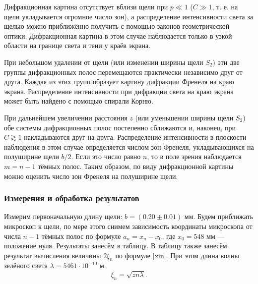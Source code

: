 \documentclass[a4paper, 12pt]{article}%
\begin{document}
	Дифракционная картина отсутствует вблизи щели при $ p \ll 1 $ ($ C \gg 1 $, т. е. на щели укладывается огромное число зон), а распределение интенсивности света за щелью можно приближённо получить с помощью законов геометрической оптики. Дифракционная картина в этом случае наблюдается только в узкой области на границе света и тени у краёв экрана.
	
	При небольшом удалении от щели (или изменении ширины щели $ S_2 $) эти две группы дифракционных полос перемещаются практически независимо друг от друга. Каждая из этих групп образует картину дифракции Френеля на краю экрана. Распределение интенсивности при дифракции света на краю экрана может быть найдено с помощью спирали Корню.
	
	При дальнейшем увеличении расстояния $ z $ (или уменьшении ширины щели $ S_2 $) обе системы дифракционных полос постепенно сближаются и, наконец, при $ C \gtrsim 1 $ накладываются друг на друга. Распределение интенсивности в плоскости наблюдения в этом случае определяется числом зон Френеля, укладывающихся на полуширине щели $ b/2 $. Если это число равно $ n $, то в поле зрения наблюдается $ m = n - 1 $ тёмных полос. Таким образом, по виду дифракционной картины можно оценить число зон Френеля на полуширине щели.
	
	\subsubsection{Измерения и обработка результатов}
	
	Измерим первоначальную длину щели: $ b = (0.20 \pm 0.01)$ мм. Будем приближать микроскоп к щели, по мере этого снимем зависимость координаты микроскопа от числа $ n - 1 $ тёмных полос по формуле $ a_n = x_n - x_0 $, где $ x_0 = 548 $ мм --- положение нуля. Результаты занесём в таблицу. В таблицу также занесём результат вычисления величины $ 2\xi_n $ по формуле \eqref{xin}. При этом длина волны зелёного света $ \lambda = 5461 \cdot 10^{-10} $ м. 
	\begin{equation}
		\xi_n = \sqrt{zn\lambda}.
	\end{equation}
	
\end{document}
